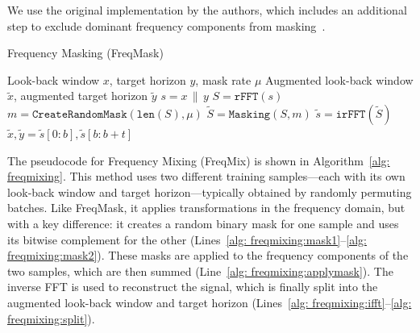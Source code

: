 \documentclass[a4paper,12pt]{report}
\begin{document}
We use the original implementation by the authors, which includes an additional step to exclude dominant frequency components from masking~\cite{chen2023fraugfrequencydomainaugmentation}.

\begin{algorithm}
     \caption{Frequency Masking (FreqMask)~\cite{chen2023fraugfrequencydomainaugmentation}}
     \label{alg: freqmasking}
     \begin{algorithmic}[1]
         \REQUIRE
             Look-back window $x$, target horizon $y$, mask rate $\mu$
         \ENSURE
             Augmented look-back window $\tilde{x}$, augmented target horizon $\tilde{y}$
         \STATE $s = x \,\|\, y$  \label{alg: freqmasking:concat}
         \STATE $S = \texttt{rFFT}(s)$  \label{alg: freqmasking:rfft}
         \STATE $m = \texttt{CreateRandomMask}(\texttt{len}(S), \mu)$  \label{alg: freqmasking:mask}
         \STATE $\tilde{S} = \texttt{Masking}(S, m)$ \label{alg: freqmasking:applymask}
         \STATE $\tilde{s} = \texttt{irFFT}(\tilde{S})$ \label{alg: freqmasking:ifft}
         \STATE $\tilde{x}, \tilde{y} = \tilde{s}[0{:}b], \tilde{s}[b{:}b{+}t]$  \label{alg: freqmasking:split}
     \end{algorithmic}
\end{algorithm}

The pseudocode for Frequency Mixing (FreqMix) is shown in Algorithm~\ref{alg: freqmixing}. This method uses two different training samples—each with its own look-back window and target horizon—typically obtained by randomly permuting batches. Like FreqMask, it applies transformations in the frequency domain, but with a key difference: it creates a random binary mask for one sample and uses its bitwise complement for the other (Lines~\ref{alg: freqmixing:mask1}–\ref{alg: freqmixing:mask2}). These masks are applied to the frequency components of the two samples, which are then summed (Line~\ref{alg: freqmixing:applymask}). The inverse FFT is used to reconstruct the signal, which is finally split into the augmented look-back window and target horizon (Lines~\ref{alg: freqmixing:ifft}–\ref{alg: freqmixing:split}).
\end{document}
